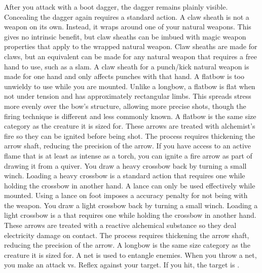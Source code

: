     After you attack with a boot dagger, the dagger remains plainly visible.
    Concealing the dagger again requires a standard action.
     A claw sheath is not a weapon on its own.
    Instead, it wraps around one of your natural weapons.
    This gives no intrinsic benefit, but claw sheaths can be imbued with magic weapon properties that apply to the wrapped natural weapon.
    Claw sheaths are made for claws, but an equivalent can be made for any natural weapon that requires a free hand to use, such as a slam.
    A claw sheath for a punch/kick natural weapon is made for one hand and only affects punches with that hand.
     A flatbow is too unwieldy to use while you are mounted.
    Unlike a longbow, a flatbow is flat when not under tension and has approximately rectangular limbs.
    This spreads stress more evenly over the bow's structure, allowing more precise shots, though the firing technique is different and less commonly known.
    A flatbow is the same size category as the creature it is sized for.
     These arrows are treated with alchemist's fire so they can be ignited before being shot.
    The process requires thickening the arrow shaft, reducing the precision of the arrow.
    If you have access to an active flame that is at least as intense as a torch, you can ignite a fire arrow as part of drawing it from a quiver.
     You draw a heavy crossbow back by turning a small winch.
    Loading a heavy crossbow is a standard action that requires one  while holding the crossbow in another hand.
     A lance can only be used effectively while mounted.
    Using a lance on foot imposes a  accuracy penalty for not being  with the weapon.
     You draw a light crossbow back by turning a small winch.
    Loading a light crossbow is a  that requires one  while holding the crossbow in another hand.
     These arrows are treated with a reactive alchemical substance so they deal electricity damage on contact.
    The process requires thickening the arrow shaft, reducing the precision of the arrow.
     A longbow is the same size category as the creature it is sized for.
     A net is used to entangle enemies. When you throw a net, you make an attack vs. Reflex against your target. If you hit, the target is \slowed.
